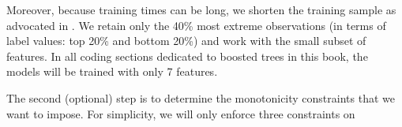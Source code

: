 \documentclass[]{krantz}
\makeatletter
\newenvironment{Shaded}{\begin{snugshade}}{\end{snugshade}}
\newcommand{\CommentTok}[1]{\textcolor[rgb]{0.37,0.37,0.37}{\textit{#1}}}
\newcommand{\DataTypeTok}[1]{\textcolor[rgb]{0.27,0.27,0.27}{#1}}
\newcommand{\FloatTok}[1]{\textcolor[rgb]{0.06,0.06,0.06}{#1}}
\newcommand{\KeywordTok}[1]{\textcolor[rgb]{0.27,0.27,0.27}{\textbf{#1}}}
\newcommand{\NormalTok}[1]{#1}
\newcommand{\OperatorTok}[1]{\textcolor[rgb]{0.43,0.43,0.43}{\textbf{#1}}}
\newcommand{\StringTok}[1]{\textcolor[rgb]{0.5,0.5,0.5}{#1}}
\newenvironment{kframe}{%
\medskip{}
\setlength{\fboxsep}{.8em}
 \def\at@end@of@kframe{}%
 \ifinner\ifhmode%
  \def\at@end@of@kframe{\end{minipage}}%
  \begin{minipage}{\columnwidth}%
 \fi\fi%
 \def\FrameCommand##1{\hskip\@totalleftmargin \hskip-\fboxsep
 \colorbox{shadecolor}{##1}\hskip-\fboxsep
     \hskip-\linewidth \hskip-\@totalleftmargin \hskip\columnwidth}%
 \MakeFramed {\advance\hsize-\width
   \@totalleftmargin\z@ \linewidth\hsize
   \@setminipage}}%
 {\par\unskip\endMakeFramed%
 \at@end@of@kframe}
\renewenvironment{Shaded}{\begin{kframe}}{\end{kframe}}
\theoremstyle{definition}
\theoremstyle{definition}
\theoremstyle{definition}
\theoremstyle{remark}
\makeatother
\begin{document}
Moreover, because training times can be long, we shorten the training
sample as advocated in \citet{coqueret2019training}. We retain only the
40\% most extreme observations (in terms of label values: top 20\% and
bottom 20\%) and work with the small subset of features. In all coding
sections dedicated to boosted trees in this book, the models will be
trained with only 7 features.

\footnotesize

\begin{Shaded}
\end{Shaded}

\normalsize

The second (optional) step is to determine the monotonicity constraints
that we want to impose. For simplicity, we will only enforce three
constraints on
\end{document}
